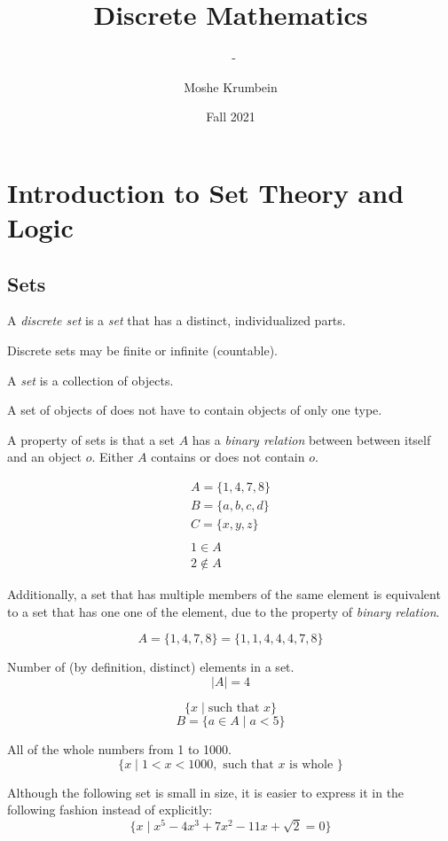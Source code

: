 \documentclass[00_complete]{subfiles}
\title{Discrete Mathematics}
\author{Moshe Krumbein}
\date{Fall 2021}
\begin{document}
\setcounter{chapter}{0}

\chapter{Introduction to Set Theory and Logic}
\subtitle{\theauthor~- \thedate}

\section{Sets}
\begin{definition}
A \emph{discrete set} is a \emph{set} that has a distinct, individualized parts.

Discrete sets may be finite or infinite (countable).
\end{definition}

\begin{definition}[Sets]
A \emph{set} is a collection of objects.

A set of objects of does not have to contain objects of only one type.

A property of sets is that a set $A$ has a \emph{binary relation} between between
itself and an object $o$. Either $A$ contains or does not contain $o$.
\end{definition}

\begin{example}
$$
\begin{gathered}
    A=\{1,4,7,8\} \\
    B=\{a,b,c,d\} \\
    C=\{x,y,z\} \\
    \\
    1 \in A \\
    2 \notin A
\end{gathered}
$$
\end{example}

Additionally, a set that has multiple members of the same element is
equivalent to a set that has one one of the element, due to the property of
\emph{binary relation}.

$$A = \{1,4,7,8\} = \{1,1,4,4,4,7,8\}$$

\begin{definition}
    Number of (by definition, distinct) elements in a set.
    $$|A| = 4$$
\end{definition}

\begin{definition}
$$\{ x \;|\; \text{such that } x \}$$
$$B = \{a \in A \;|\; a < 5 \}$$
\begin{example}
All of the whole numbers from 1 to 1000.
$$\{x \;|\; 1<x<1000, \text{ such that $x$ is whole }\}$$
\end{example}

Although the following set is small in size, it is easier to express it in
the following fashion instead of explicitly:
$$\{x \;|\; x^5-4x^3+7x^2-11x+\sqrt 2=0\}$$
\end{definition}
\end{document}
